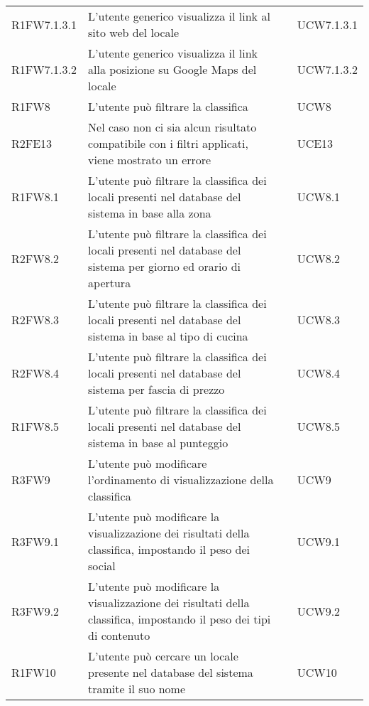 \begin{longtable}{ m{}<{\centering}  m{}<{\centering}  m{}<{\centering}  m{}<{\centering}}
	R1FW7.1.3.1 & L'utente generico visualizza il link al sito web del locale & \Ob & UCW7.1.3.1 \\
	
	R1FW7.1.3.2 &	L'utente generico visualizza il link alla posizione su Google Maps del locale & \Ob & UCW7.1.3.2 \\		
	 
	R1FW8 & L’utente può filtrare la classifica & \Ob & UCW8\\		
	
	R2FE13 & Nel caso non ci sia alcun risultato compatibile con i filtri applicati, viene mostrato un errore & \De & UCE13\\	
	 
	R1FW8.1 & L’utente può filtrare la classifica dei locali presenti nel database del sistema in base alla zona & \Ob & UCW8.1\\	
	 
	R2FW8.2 & L’utente può filtrare la classifica dei locali presenti nel database del sistema per giorno ed orario di apertura & \De & UCW8.2\\	
	 
	R2FW8.3 & L’utente può filtrare la classifica dei locali presenti nel database del sistema in base al tipo di cucina & \Ob & UCW8.3\\	
	 
	R2FW8.4 & L’utente può filtrare la classifica dei locali presenti nel database del sistema per fascia di prezzo & \De & UCW8.4\\	 
	 
	R1FW8.5 & L’utente può filtrare la classifica dei locali presenti nel database del sistema in base al punteggio & \De & UCW8.5\\	 
	 
	R3FW9 & L’utente può modificare l’ordinamento di visualizzazione della classifica & \Fa & UCW9\\	
	 
	R3FW9.1 & L’utente può modificare la visualizzazione dei risultati della classifica, impostando il peso dei social & \Fa & UCW9.1\\	 
	 
	R3FW9.2 & L’utente può modificare la visualizzazione dei risultati della classifica, impostando il peso dei tipi di contenuto & \Fa & UCW9.2\\	  
	 
	R1FW10 & L’utente può cercare un locale presente nel database del sistema tramite il suo nome & \Ob & UCW10 \\	 
	 

\end{longtable}
